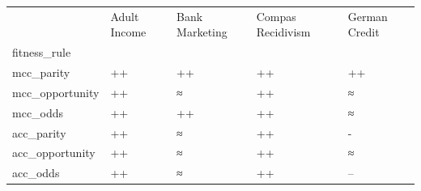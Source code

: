 \begin{tabular}{lllll}
\toprule
 & Adult Income & Bank Marketing & Compas Recidivism & German Credit \\
fitness_rule &  &  &  &  \\
\midrule
mcc_parity & ++ & ++ & ++ & ++ \\
mcc_opportunity & ++ & ≈ & ++ & ≈ \\
mcc_odds & ++ & ++ & ++ & ≈ \\
acc_parity & ++ & ≈ & ++ & - \\
acc_opportunity & ++ & ≈ & ++ & ≈ \\
acc_odds & ++ & ≈ & ++ & -- \\
\bottomrule
\end{tabular}

